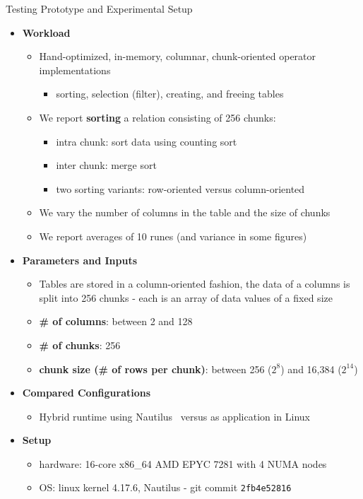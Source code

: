 \begin{block}{Testing Prototype and Experimental Setup}
  \begin{itemize}
    \item \textbf{Workload}
      \begin{itemize}
      \item Hand-optimized, in-memory, columnar, chunk-oriented operator
        implementations
    \begin{itemize}
    \item sorting, selection (filter), creating, and freeing tables
      \end{itemize}
  \item We report \textbf{sorting} a relation consisting of 256 chunks:
    \begin{itemize}
    \item intra chunk: sort data using counting sort
    \item inter chunk: merge sort
    \item two sorting variants: row-oriented versus column-oriented
\end{itemize}
\item We vary the number of columns in the table and the size of chunks
\item We report averages of 10 runes (and variance in some figures)
  \end{itemize}
\item \textbf{Parameters and Inputs}
  \begin{itemize}
  \item Tables are stored in a column-oriented fashion, the data of a columns is split into 256 chunks - each is an array of data values of a fixed size 
  \item \textbf{\# of columns}: between 2 and 128
  \item \textbf{\# of chunks}: 256
  \item \textbf{chunk size (\# of rows per chunk)}: between 256 ($2^8$) and 16,384 ($2^{14}$)
  \end{itemize}
\item \textbf{Compared Configurations}
    \begin{itemize}
    \item Hybrid runtime using Nautilus~\cite{HALE:2015:NAUTILUS} versus as application in Linux 
    \end{itemize}
  \item \textbf{Setup}
    \begin{itemize}
    \item hardware: 16-core x86\_64 AMD EPYC 7281 with 4 NUMA nodes
    \item OS: linux kernel 4.17.6, Nautilus - git commit \texttt{2fb4e52816}
    \end{itemize}
  \end{itemize}
\end{block}
